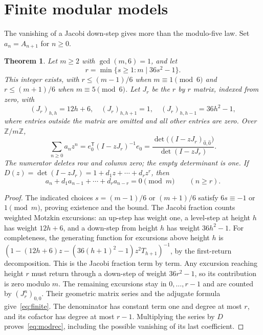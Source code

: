 \documentclass[11pt]{article}
\newtheorem{theorem}{Theorem}
\newcommand{\Z}{\mathbb Z}
\begin{document}
\section{Finite modular models}
The vanishing of a Jacobi down-step gives more than the modulo-five
law. Set $a_n=A_{n+1}$ for $n\geq0$.
\begin{theorem}\label{thm:modular}
Let $m\geq2$ with $\gcd(m,6)=1$, and let
\[
 r=\min\{s\geq1:m\mid 36s^2-1\}.
\]
This integer exists, with $r\leq(m-1)/6$ when $m\equiv1\pmod6$ and
$r\leq(m+1)/6$ when $m\equiv5\pmod6$.
Let $J_r$ be the $r$ by $r$ matrix, indexed from zero, with
\[
 (J_r)_{h,h}=12h+6,\quad (J_r)_{h,h+1}=1,\quad
 (J_r)_{h,h-1}=36h^2-1,
\]
where entries outside the matrix are omitted and all other entries
are zero. Over $\Z/m\Z$,
\begin{equation}\label{eq:finite}
 \sum_{n\geq0}a_nz^n
 =e_0^{\mathsf T}(I-zJ_r)^{-1}e_0
 =\frac{\det\bigl((I-zJ_r)_{\widehat0,\widehat0}\bigr)}{\det(I-zJ_r)}.
\end{equation}
The numerator deletes row and column zero; the empty determinant is one. If
$D(z)=\det(I-zJ_r)=1+d_1z+\cdots+d_rz^r$, then
\begin{equation}\label{eq:modrec}
 a_n+d_1a_{n-1}+\cdots+d_ra_{n-r}=0\pmod m
 \qquad(n\geq r).
\end{equation}
\end{theorem}
\begin{proof}
The indicated choices $s=(m-1)/6$ or $(m+1)/6$ satisfy
$6s\equiv-1$ or $1\pmod m$, proving existence and the bound.
The Jacobi fraction counts weighted Motzkin excursions: an up-step
has weight one, a level-step at height $h$ has weight $12h+6$, and
a down-step from height $h$ has weight $36h^2-1$.
For completeness, the generating function for excursions above height
$h$ is $(1-(12h+6)z-(36(h+1)^2-1)z^2T_{h+1})^{-1}$, by the
first-return decomposition. This is the Jacobi fraction term by term.
Any excursion reaching height $r$ must return through a down-step
of weight $36r^2-1$, so its contribution is zero modulo $m$.
The remaining excursions stay in $0,\ldots,r-1$ and are counted by
$(J_r^n)_{0,0}$. Their geometric matrix series and the adjugate formula
give~\eqref{eq:finite}. The denominator has constant term one and
degree at most $r$, and its cofactor has degree at most $r-1$.
Multiplying the series by $D$ proves~\eqref{eq:modrec}, including
the possible vanishing of its last coefficient.
\end{proof}
\end{document}
